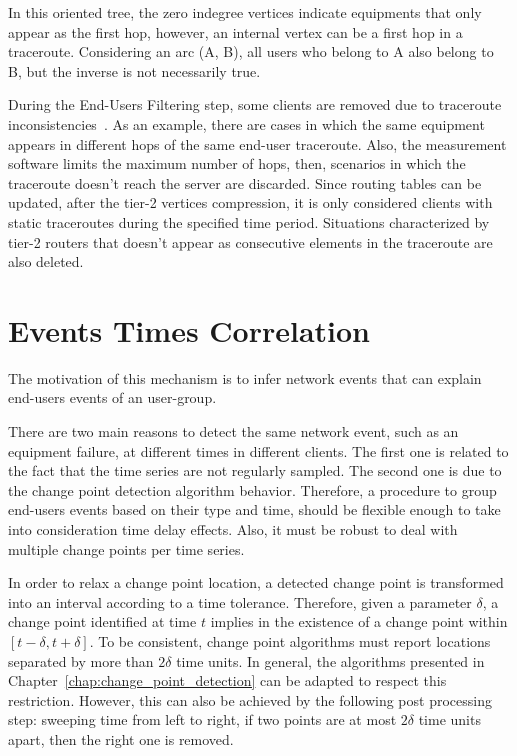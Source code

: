 In this oriented tree, the zero
indegree vertices indicate equipments that only appear as the first hop,
however, an internal vertex can be a first hop in a traceroute.
Considering an arc (A, B), all users who belong to A also belong to B,
but the inverse is not necessarily true.

During the End-Users Filtering step, some clients are removed due to traceroute
inconsistencies~\cite{avoiding_traceroute_anomalies_with_paris_traceroute}.
As an example, there are cases in which the same equipment appears in different
hops of the same end-user traceroute. Also,
the measurement software limits the maximum number of hops, then,
scenarios in which the traceroute doesn't reach the server are discarded.
Since routing tables can be updated, after the tier-2 vertices compression,
it is only considered clients with static traceroutes
during the specified time period.
Situations characterized by tier-2 routers that doesn't appear as consecutive
elements in the traceroute are also deleted.

\section{Events Times Correlation}
\label{sec:events_times_correlation}

The motivation of this mechanism is to infer network events that can explain
end-users events of an user-group.

There are two main reasons to detect the same network event, such as an
equipment failure, at different times in different clients. The first one is
related to the fact that the time series are not regularly sampled. The second
one is due to the change point detection algorithm behavior.
Therefore, a procedure to group end-users events based on their type and time,
should be flexible enough to take into consideration time delay effects. Also,
it must be robust to deal with multiple change points per time series.

In order to relax a change point location, a detected change point is
transformed into an interval according to a time tolerance.
Therefore, given a parameter $\delta$, a change point identified at
time $t$ implies in the existence of a change point within
$[t - \delta, t + \delta]$. To be consistent,
change point algorithms must report locations separated by more than
$2 \delta$ time units. In general, the algorithms presented in
Chapter~\ref{chap:change_point_detection}
can be adapted to respect this restriction. However, this can also be
achieved by the following post processing step:
sweeping time from left to right, if two
points are at most $2 \delta$ time units apart, then the right one is removed.

